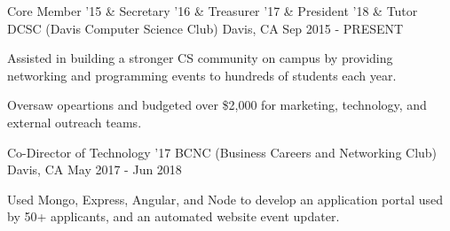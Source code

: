 

\begin{cventries}

  \cventry
  {Core Member '15 \& Secretary '16 \& Treasurer '17 \& President '18 \& Tutor} %
  {DCSC (Davis Computer Science Club)} %
  {Davis, CA} %
  {Sep 2015 - PRESENT} %
  {
    \begin{cvitems} %
      \item {Assisted in building a stronger CS community on campus by providing networking and programming events to hundreds of students each year.}
      \item {Oversaw opeartions and budgeted over \$2,000 for marketing, technology, and external outreach teams.}
    \end{cvitems}
  }

  \cventry
  {Co-Director of Technology '17} %
  {BCNC (Business Careers and Networking Club)} %
  {Davis, CA} %
  {May 2017 - Jun 2018} %
  {
    \begin{cvitems} %
      \item {Used Mongo, Express, Angular, and Node to develop an application portal used by 50+ applicants, and an automated website event updater.}
    \end{cvitems}
  }
\end{cventries}
